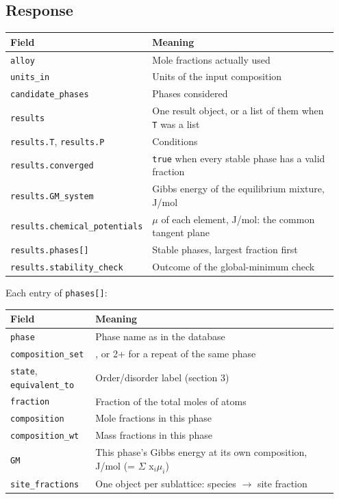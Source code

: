 \documentclass[12pt,a4paper]{article}
\begin{document}
\subsection*{Response}
\begingroup\small
\begin{longtable}{>{\raggedright\arraybackslash}p{0.305\linewidth}>{\raggedright\arraybackslash}p{0.642\linewidth}}
\toprule
\textbf{Field} & \textbf{Meaning} \\
\midrule
\endhead
\texttt{alloy} & Mole fractions actually used \\
\texttt{units\_\allowbreak{}in} & Units of the input composition \\
\texttt{candidate\_\allowbreak{}phases} & Phases considered \\
\texttt{results} & One result object, or a list of them when \texttt{T} was a list \\
\texttt{results.\allowbreak{}T}, \texttt{results.\allowbreak{}P} & Conditions \\
\texttt{results.\allowbreak{}converged} & \texttt{true} when every stable phase has a valid fraction \\
\texttt{results.\allowbreak{}GM\_\allowbreak{}system} & Gibbs energy of the equilibrium mixture, J/mol \\
\texttt{results.\allowbreak{}chemical\_\allowbreak{}potentials} & \(\mu\) of each element, J/mol: the common tangent plane \\
\texttt{results.\allowbreak{}phases[]} & Stable phases, largest fraction first \\
\texttt{results.\allowbreak{}stability\_\allowbreak{}check} & Outcome of the global-minimum check \\
\bottomrule
\end{longtable}
\endgroup
Each entry of \texttt{phases[]}:

\begingroup\small
\begin{longtable}{>{\raggedright\arraybackslash}p{0.219\linewidth}>{\raggedright\arraybackslash}p{0.728\linewidth}}
\toprule
\textbf{Field} & \textbf{Meaning} \\
\midrule
\endhead
\texttt{phase} & Phase name as in the database \\
\texttt{composition\_\allowbreak{}set} & 1, or 2+ for a repeat of the same phase \\
\texttt{state}, \texttt{equivalent\_\allowbreak{}to} & Order/disorder label (section 3) \\
\texttt{fraction} & Fraction of the total moles of atoms \\
\texttt{composition} & Mole fractions in this phase \\
\texttt{composition\_\allowbreak{}wt} & Mass fractions in this phase \\
\texttt{GM} & This phase's Gibbs energy at its own composition, J/mol (= \(\Sigma\) x\(_{i} \mu _{i}\)) \\
\texttt{site\_\allowbreak{}fractions} & One object per sublattice: species \(\rightarrow\) site fraction \\
\bottomrule
\end{longtable}
\endgroup
\end{document}
